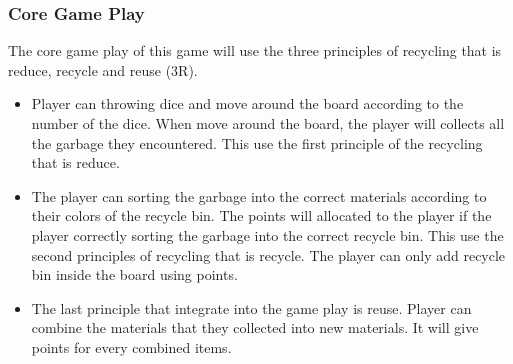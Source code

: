 \documentclass[12pt]{article}
\begin{document}
\subsubsection{Core Game Play}
The core game play of this game will use the three principles of recycling that is reduce, recycle and reuse (3R). 
\begin{itemize}
    \item Player can throwing dice and move around the board according to the number of the dice. When move around the board, the player will collects all the garbage they encountered. This use the first principle of the recycling that is reduce.
    \item The player can sorting the garbage into the correct materials according to their colors of the recycle bin. The points will allocated to the player if the player correctly sorting the garbage into the correct recycle bin. This use the second principles of recycling that is recycle. The player can only add recycle bin inside the board using points. 
    \item The last principle that integrate into the game play is reuse. Player can combine the materials that they collected into new materials. It will give points for every combined items.
    
\end{itemize}
\end{document}
